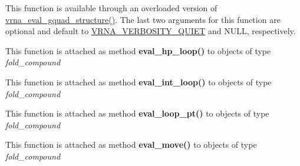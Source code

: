 \begin{DoxyRefList}
\item[Global \mbox{\hyperlink{group__eval_gaeaa2bdbc1b5d78c667e735fbdff87fff}{vrna\+\_\+eval\+\_\+gquad\+\_\+structure\+\_\+v}} (const char $\ast$string, const char $\ast$structure, int verbosity\+\_\+level, F\+I\+LE $\ast$file)]\label{wrappers__wrappers000065}%
%
 This function is available through an overloaded version of \mbox{\hyperlink{group__eval_ga3263504825ef4b523eba797c99921df4}{vrna\+\_\+eval\+\_\+gquad\+\_\+structure()}}. The last two arguments for this function are optional and default to \mbox{\hyperlink{group__eval_gaf4afe19780b61b4962c613bde324128b}{V\+R\+N\+A\+\_\+\+V\+E\+R\+B\+O\+S\+I\+T\+Y\+\_\+\+Q\+U\+I\+ET}} and N\+U\+LL, respectively.  
\item[Global \mbox{\hyperlink{group__eval__loops__hp_gad0bb844f8dc704c71737ae1d7e32b975}{vrna\+\_\+eval\+\_\+hp\+\_\+loop}} (vrna\+\_\+fold\+\_\+compound\+\_\+t $\ast$fc, int i, int j)]\label{wrappers__wrappers000051}%
%
 This function is attached as method {\bfseries{eval\+\_\+hp\+\_\+loop()}} to objects of type {\itshape fold\+\_\+compound}  
\item[Global \mbox{\hyperlink{group__eval__loops__int_gaab3547bfcdc39d89babbc7ed2a1a4b65}{vrna\+\_\+eval\+\_\+int\+\_\+loop}} (vrna\+\_\+fold\+\_\+compound\+\_\+t $\ast$fc, int i, int j, int k, int l)]\label{wrappers__wrappers000052}%
%
 This function is attached as method {\bfseries{eval\+\_\+int\+\_\+loop()}} to objects of type {\itshape fold\+\_\+compound}  
\item[Global \mbox{\hyperlink{group__eval__loops_ga730ba4df55c02fd530a0cddd49faf760}{vrna\+\_\+eval\+\_\+loop\+\_\+pt}} (vrna\+\_\+fold\+\_\+compound\+\_\+t $\ast$vc, int i, const short $\ast$pt)]\label{wrappers__wrappers000048}%
%
 This function is attached as method {\bfseries{eval\+\_\+loop\+\_\+pt()}} to objects of type {\itshape fold\+\_\+compound}  
\item[Global \mbox{\hyperlink{group__eval__move_gaff1b9e4f4d17b434b0a822fe783672c1}{vrna\+\_\+eval\+\_\+move}} (vrna\+\_\+fold\+\_\+compound\+\_\+t $\ast$vc, const char $\ast$structure, int m1, int m2)]\label{wrappers__wrappers000049}%
%
 This function is attached as method {\bfseries{eval\+\_\+move()}} to objects of type {\itshape fold\+\_\+compound}  
\item[Global \mbox{\hyperlink{group__eval__move_ga123dabc119ea98c968a5e903cc46f0fb}{vrna\+\_\+eval\+\_\+move\+\_\+pt}} (vrna\+\_\+fold\+\_\+compound\+\_\+t $\ast$vc, short $\ast$pt, int m1, int m2)]\label{wrappers__wrappers000050}%

\end{DoxyRefList}
